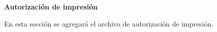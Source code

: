 \thispagestyle{plain}
\begin{center}
	\Large    
	\vspace{0.9cm}
	\textbf{Autorización de impresión}
\end{center}
En esta sección se agregará el archivo de autorización de impresión.